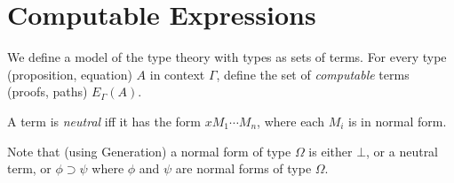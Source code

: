 
\section{Computable Expressions}

We define a model of the type theory with types as sets of terms.  For every type (proposition, equation) $A$ in context $\Gamma$, define
the set of \emph{computable} terms (proofs, paths) $E_\Gamma(A)$.

\begin{definition}[Neutral]
A term is \emph{neutral} iff it has the form $x M_1 \cdots M_n$, where each $M_i$ is in normal form.
\end{definition}

Note that (using Generation) a normal form of type $\Omega$ is either $\bot$, or a neutral term, or $\phi \supset \psi$ where $\phi$ and $\psi$ are normal forms of type $\Omega$.

